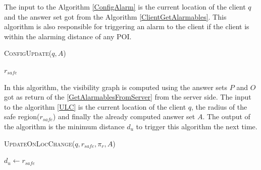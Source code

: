 The input to the Algorithm \ref{ConfigAlarm} is the current location of the client $q$ and the answer set got from the Algorithm \ref{ClientGetAlarmables}. This algorithm is also responsible for triggering an alarm to the client if the client is within the alarming distance of any POI.
\begin{algorithm}
\caption{\textsc{ConfigUpdate}($q, A$)}
\label{ConfigAlarm}

    
    \Return $r_{safe}$

\end{algorithm}

In this algorithm, the visibility graph is computed using the answer sets $P$ and $O$ got as return of the \ref{GetAlarmablesFromServer} from the server side.
The input to the algorithm \ref{ULC} is the current location of the client $q$, the radius of the safe region($r_{safe}$) and finally the already computed answer set $A$. The output of the algorithm is the minimum distance $d_u$ to trigger this algorithm the next time.

\begin{algorithm}
\caption{\textsc{UpdateOnLocChange}($q, r_{safe}, \pi_r, A$)}
\label{ULC}

    
    
    
    \Return $d_u \gets r_{safe}$

\end{algorithm}

